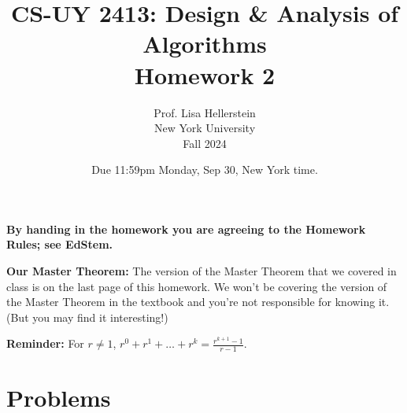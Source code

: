 \documentclass{article}
\title{CS-UY 2413: Design \& Analysis of Algorithms \\ Homework 2}
\author{Prof. Lisa Hellerstein \\ New York University \\ Fall 2024}
\date{Due 11:59pm Monday, Sep 30, New York time.}
\begin{document}
\maketitle

\textbf{By handing in the homework you are agreeing to the Homework Rules; see EdStem.}

\textbf{Our Master Theorem:} The version of the Master Theorem that we covered in class is on the last page of this homework. We won’t be covering the version of the Master Theorem in the textbook and you’re not responsible for knowing it. (But you may find it interesting!)

\textbf{Reminder:} For $r \neq 1$, $r^0 + r^1 + \dots + r^k = \frac{r^{k+1} - 1}{r - 1}$.

\section*{Problems}
\end{document}
